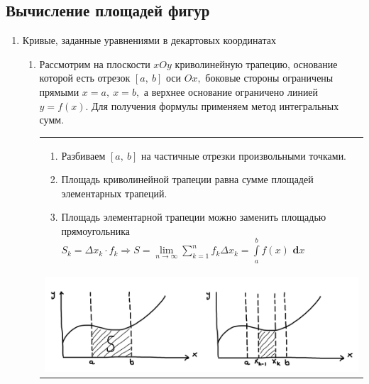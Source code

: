 \documentclass[a4paper,12pt, centered]{bookest}
\theoremstyle{remark}
\newcommand\tab[1][1cm]{\hspace*{#1}}
\newcommand\dx{\textbf{ d}x}
\begin{document}
\subsection{Вычисление площадей фигур}
\begin{enumerate}
	\item Кривые, заданные уравнениями в декартовых координатах
		\begin{enumerate} 
			\item Рассмотрим на плоскости $xOy$ криволинейную трапецию, основание которой есть отрезок $[a,\>b]$ оси $Ox,$ боковые стороны ограничены прямыми $x=a,\>x=b,$ а верхнее основание ограничено линией $y=f(x).$ Для получения формулы применяем метод интегральных сумм.\\
			\begin{table}[htp]\centering
\tab\tab\begin{tabular}{p{14cm}}
\begin{enumerate} 
				\item Разбиваем $[a,\>b]$ на частичные отрезки произвольными точками. 
				\item Площадь криволинейной трапеции равна сумме площадей элементарных трапеций. 
				\item  Площадь элементарной трапеции можно заменить площадью прямоугольника $S_k=\Delta x_k\cdot f_k\Rightarrow S=\lim\limits_{n\to\infty}\sum\limits_{k=1}^nf_k\Delta x_k=\int\limits_a^bf(x)\dx$
				\end{enumerate}\\
				\includegraphics[width=14cm]{2_9_2_2}

\end{tabular}
\end{table} 


\end{enumerate}
\end{enumerate}
\end{document}
